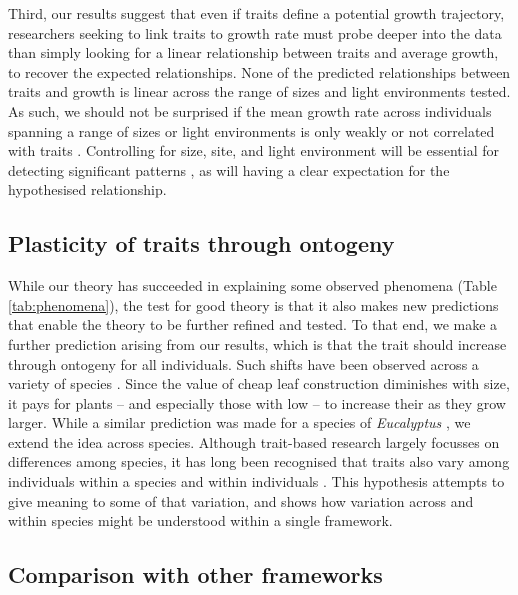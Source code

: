 \documentclass[9pt,twocolumn,twoside,lineno]{pnas-new}
\begin{document}
Third, our results suggest that even if traits define a potential growth trajectory, researchers seeking to link traits to growth rate must probe deeper into the data than simply looking for a linear relationship between traits and average growth, to recover the expected relationships. None of the predicted relationships between traits and growth is linear across the range of sizes and light environments tested. As such, we should not be surprised if the mean growth rate across individuals spanning a range of sizes or light environments is only weakly or not correlated with traits \citep[e.g.][]{Poorter-2008,Paine-2015}. Controlling for size, site, and light environment will be essential for detecting significant patterns \citep[e.g.][]{Gibert-2016}, as will having a clear expectation for the hypothesised relationship.

\subsection{Plasticity of traits through ontogeny}

While our theory has succeeded in explaining some observed phenomena (Table \ref{tab:phenomena}), the test for good theory is that it also makes new predictions that enable the theory to be further refined and tested. To that end, we make a further prediction arising from our results, which is that the trait {\lma} should increase through ontogeny for all individuals. Such shifts have been observed across a variety of species \citep{King-1999,Thomas-1999,Koch-2004}. Since the value of cheap leaf construction diminishes with size, it pays for plants -- and especially those with low {\lma} -- to increase their {\lma} as they grow larger. While a similar prediction was made for a species of \emph{Eucalyptus} \citep{King-1999}, we extend the idea across species. Although trait-based research largely focusses on differences among species, it has long been recognised that traits also vary among individuals within a species and within individuals \citep{Westoby-2002}. This hypothesis attempts to give meaning to some of that variation, and shows how variation across and within species might be understood within a single framework.

\subsection{Comparison with other frameworks}
\end{document}
